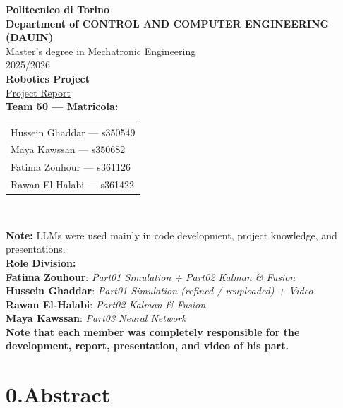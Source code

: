 \documentclass[11pt,a4paper]{article}
\begin{document}
\begin{titlepage}
\centering

\vspace*{1.5cm}
{\color{politoblue}\Large\textbf{Politecnico di Torino}}\\[1.5cm]

{\large\textbf{Department of CONTROL AND COMPUTER ENGINEERING (DAUIN)}}\\[0.6cm]
{\large Master's degree in Mechatronic Engineering}\\[0.2cm]
{\large 2025/2026}\\[1.5cm]

{\Huge\textbf{Robotics Project}}\\[0.6cm]
{\Large\underline{Project Report}}\\[1.5cm]

{\large\textbf{Team 50 --- Matricola:}}\\[0.4cm]
\begin{tabular}{l}
Hussein Ghaddar --- s350549\\
Maya Kawssan --- s350682\\
Fatima Zouhour --- s361126\\
Rawan El-Halabi --- s361422\\
\end{tabular}\\[1.5cm]

\begin{flushleft}
\textbf{Note:} LLMs were used mainly in code development, project knowledge, and
presentations.\\[0.8cm]

\textbf{Role Division:}\\[0.2cm]
\textbf{Fatima Zouhour}: \textit{Part01 Simulation + Part02 Kalman \& Fusion}\\[0.2cm]
\textbf{Hussein Ghaddar}: \textit{Part01 Simulation (refined / reuploaded) + Video}\\[0.2cm]
\textbf{Rawan El-Halabi}: \textit{Part02 Kalman \& Fusion}\\[0.2cm]
\textbf{Maya Kawssan}: \textit{Part03 Neural Network}\\[0.6cm]

\textbf{Note that each member was completely responsible for the development,
report, presentation, and video of his part.}
\end{flushleft}

\vfill
\end{titlepage}


\section*{0.\quad Abstract}
\end{document}
